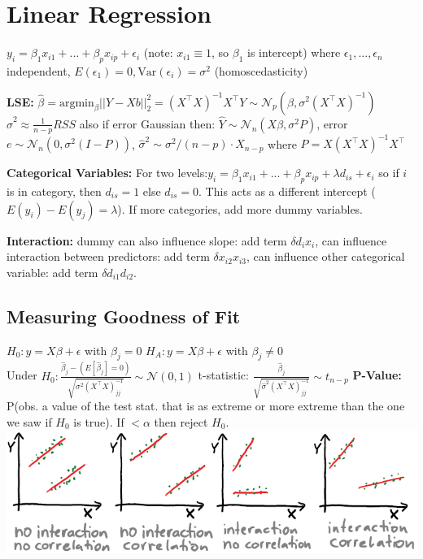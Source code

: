 \section*{Linear Regression}
$y_i = \beta_1 x_{i1}+...+\beta_p x_{ip} + \epsilon_i$ (note: $x_{i1}\equiv 1$, so $\beta_1$ is intercept) where $\epsilon_1,...,\epsilon_n$ independent, $E(\epsilon_1)=0, \text{Var} (\epsilon_i)=\sigma^2$ (homoscedasticity)

\textbf{LSE:} $\hat \beta = \text{argmin}_\beta ||Y-Xb||_2^2 = (X^\top X)^{-1}X^\top Y \sim \mathcal{N}_p(\beta, \sigma^2 (X^\top X)^{-1})$ \\
$\hat \sigma^2 \approx \frac 1 {n-p}RSS$
also if error Gaussian then: $\hat Y \sim \mathcal{N}_n(X\beta, \sigma^2 P)$, error\\
$e \sim \mathcal{N}_n(0, \sigma^2(I-P))$,
$\hat \sigma^2 \sim {\sigma^2 }/{(n-p)}\cdot X_{n-p}$
where $P=X(X^\top X)^{-1}X^\top $

\textbf{Categorical Variables:} 
For two levels:$y_i = \beta_1 x_{i1}+...+\beta_p x_{ip} + \lambda d_{is} + \epsilon_i$ 
so if $i$ is in category, then $d_{is}=1$ else $d_{is}=0$. This acts as a different intercept ($E(y_i)-E(y_j)=\lambda$). If more categories, add more dummy variables.

\textbf{Interaction:} dummy can also influence slope: add term $\delta d_i x_i$, can influence interaction between predictors: add term $\delta x_{i2} x_{i3}$, can influence other categorical variable: add term $\delta d_{i1}d_{i2}$.

\subsection*{Measuring Goodness of Fit}
$H_0: y = X\beta + \epsilon$ with $\beta_j=0$
$H_A: y = X\beta + \epsilon$ with $\beta_j\neq 0$\\
Under $H_0: \frac{\hat \beta_j - (E[\hat \beta_j]=0)}{\sqrt{\sigma^2(X^\top X)^{-1}_{jj}}} \sim \mathcal{N}(0,1)$
t-statistic: $\frac{\hat \beta_j}{\sqrt{\hat \sigma^2 (X^\top X)^{-1}_{jj}}} \sim t_{n-p}$
\textbf{P-Value:} P(obs. a value of the test stat. that is as extreme or more extreme than the one we saw if $H_0$ is true).
If $< \alpha$ then reject $H_0$.
\includegraphics[width=0.7\linewidth]{interaction.PNG}

